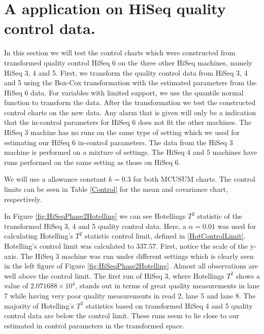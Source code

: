\documentclass[a4paper,11pt,fleqn,twoside,notitlepage]{report}\usepackage[]{graphicx}\usepackage[]{color}
\makeatletter
\newenvironment{kframe}{%
 \def\at@end@of@kframe{}%
 \ifinner\ifhmode%
  \def\at@end@of@kframe{\end{minipage}}%
  \begin{minipage}{\columnwidth}%
 \fi\fi%
 \def\FrameCommand##1{\hskip\@totalleftmargin \hskip-\fboxsep
 \colorbox{shadecolor}{##1}\hskip-\fboxsep
     \hskip-\linewidth \hskip-\@totalleftmargin \hskip\columnwidth}%
 \MakeFramed {\advance\hsize-\width
   \@totalleftmargin\z@ \linewidth\hsize
   \@setminipage}}%
 {\par\unskip\endMakeFramed%
 \at@end@of@kframe}
\newenvironment{knitrout}{}{} %
\makeatother
\begin{document}
\section{A application on HiSeq quality control data.}


\begin{knitrout}
\color{fgcolor}\begin{kframe}


{\ttfamily\noindent\color{warningcolor}{\#\# Warning: package 'Rcpp' was built under R version 3.2.5}}

{\ttfamily\noindent\color{warningcolor}{\#\# Warning: package 'RcppArmadillo' was built under R version 3.2.5}}\end{kframe}
\end{knitrout}


In this section we will test the control charts which were constructed from transformed quality control HiSeq 6 on the three other HiSeq machines, namely HiSeq 3, 4 and 5. First, we transform the quality control data from HiSeq 3, 4 and 5 using the Box-Cox transformation with the estimated parameters from the HiSeq 6 data. For variables with limited support, we use the quantile normal function to transform the data. After the transformation we test the constructed control charts on the new data. Any alarm that is given will only be a indication that the in-control parameters for HiSeq 6 does not fit the other machines. 
The HiSeq 3 machine has no runs on the same type of setting which we used for estimating our HiSeq 6 in-control parameters. The data from the HiSeq 3 machine is performed on a mixture of settings. The HiSeq 4 and 5 machines have runs performed on the same setting as those on HiSeq 6.



We will use a allowance constant $k=0.3$ for both MCUSUM charts. The control limits can be seen in Table \ref{Control} for the mean and covariance chart, respectively.

In Figure \ref{fig:HiSeqPhase2Hotelling} we can see Hotellings $T^2$ statistic of the transformed HiSeq 3, 4 and 5 quality control data. Here, a $\alpha=0.01$ was used for calculating Hotelling's $T^2$ statistic control limit, defined in \eqref{HotControlLimit}. Hotelling's control limit was calculated to $337.57$. First, notice the scale of the y-axis. The HiSeq 3 machine was run under different settings which is clearly seen in the left figure of Figure \ref{fig:HiSeqPhase2Hotelling}. Almost all observations are well above the control limit. The first run of HiSeq 3, where Hotellings $T^2$ shows a value of $\ensuremath{2.071688\times 10^{4}}$, stands out in terms of great quality measurements in lane 7 while having very poor quality measurements in read 2, lane 5 and lane 8. The majority of Hotelling's $T^2$ statistics based on transformed HiSeq 4 and 5 quality control data are below the control limit. These runs seem to lie close to our estimated in control parameters in the transformed space.
\end{document}
